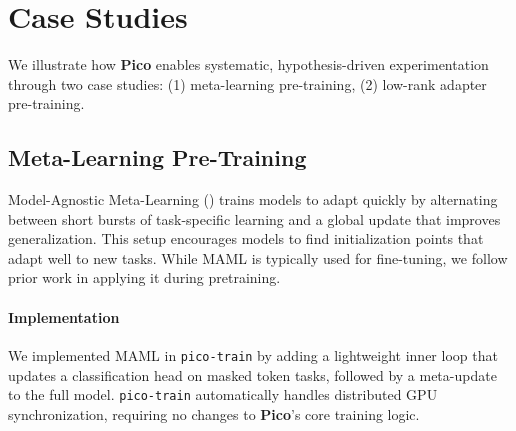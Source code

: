 \section{Case Studies}


We illustrate how \textbf{Pico} enables systematic, hypothesis-driven experimentation through two case studies: (1) meta-learning pre-training, (2) low-rank adapter pre-training.

\subsection{Meta-Learning Pre-Training}

Model-Agnostic Meta-Learning (\citealp[MAML]{finn2017maml}) trains models to adapt quickly by alternating between short bursts of task-specific learning and a global update that improves generalization. This setup encourages models to find initialization points that adapt well to new tasks. While MAML is typically used for fine-tuning, we follow prior work \citep{bansal2020smlmt, li2021semisupervised} in applying it during pretraining.%


\paragraph{Implementation} We implemented MAML in \texttt{pico-train} by adding a lightweight inner loop that updates a classification head on masked token tasks, followed by a meta-update to the full model. \texttt{pico-train} automatically handles distributed GPU synchronization, requiring no changes to \textbf{Pico}'s core training logic.

